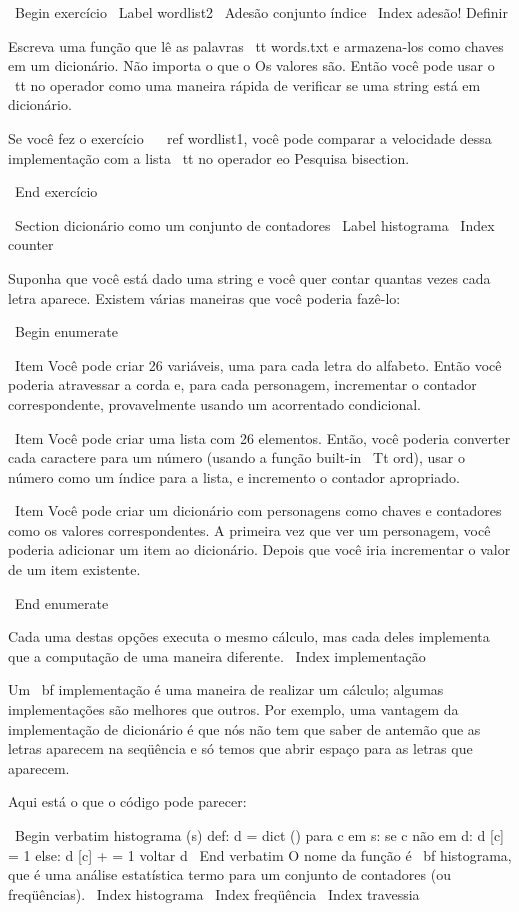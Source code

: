 \documentclass[10pt]{book}
\begin{document}
\begin {itemize}
{{{{{{{\ Begin {} exercício
\ Label {} wordlist2
\ {Adesão conjunto} índice
\ Index {adesão! Definir}

Escreva uma função que lê as palavras {\ tt words.txt} e
armazena-los como chaves em um dicionário. Não importa o que o
Os valores são. Então você pode usar o {\ tt no} operador
como uma maneira rápida de verificar se uma string está em
dicionário.

Se você fez o exercício ~ \ ref {} wordlist1, você pode comparar a velocidade
dessa implementação com a lista {\ tt no} operador eo
Pesquisa bisection.

\ End {} exercício


\ Section {dicionário como um conjunto de contadores}
\ Label {} histograma
\ Index {counter}

Suponha que você está dado uma string e você quer contar quantas
vezes cada letra aparece. Existem várias maneiras que você poderia fazê-lo:

\ Begin {enumerate}

\ Item Você pode criar 26 variáveis, uma para cada letra do
alfabeto. Então você poderia atravessar a corda e, para cada
personagem, incrementar o contador correspondente, provavelmente usando
um acorrentado condicional.

\ Item Você pode criar uma lista com 26 elementos. Então, você poderia
converter cada caractere para um número (usando a função built-in
{\ Tt ord}), usar o número como um índice para a lista, e incremento
o contador apropriado.

\ Item Você pode criar um dicionário com personagens como chaves
e contadores como os valores correspondentes. A primeira vez que
ver um personagem, você poderia adicionar um item ao dicionário. Depois
que você iria incrementar o valor de um item existente.

\ End {enumerate}

Cada uma destas opções executa o mesmo cálculo, mas cada
deles implementa que a computação de uma maneira diferente.
\ Index {implementação}

Um {\ bf implementação} é uma maneira de realizar um cálculo;
algumas implementações são melhores que outros. Por exemplo,
uma vantagem da implementação de dicionário é que nós não
tem que saber de antemão que as letras aparecem na seqüência
e só temos que abrir espaço para as letras que aparecem.

Aqui está o que o código pode parecer:

\ Begin {verbatim}
histograma (s) def:
    d = dict ()
    para c em s:
        se c não em d:
            d [c] = 1
        else:
            d [c] + = 1
    voltar d
\ End {verbatim}
%
O nome da função é {\ bf histograma}, que é uma análise estatística
termo para um conjunto de contadores (ou freqüências).
\ Index {} histograma
\ Index {freqüência}
\ Index {travessia}

}}}}}}}
\end{itemize}
\end{document}
